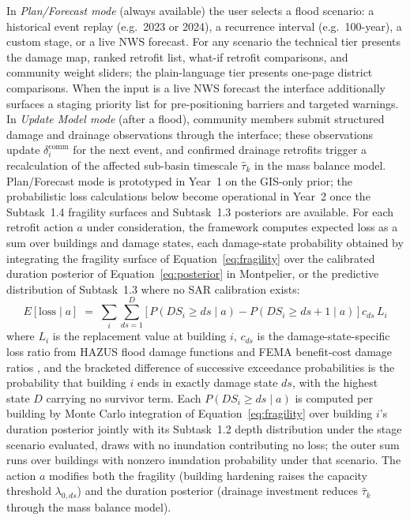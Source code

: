 \documentclass[11pt]{article}
\begin{document}
In \textit{Plan/Forecast mode} (always available) the user selects a flood scenario: a historical event replay (e.g.\ 2023 or 2024), a recurrence interval (e.g.\ 100-year), a custom stage, or a live NWS forecast. For any scenario the technical tier presents the damage map, ranked retrofit list, what-if retrofit comparisons, and community weight sliders; the plain-language tier presents one-page district comparisons. When the input is a live NWS forecast the interface additionally surfaces a staging priority list for pre-positioning barriers and targeted warnings.
In \textit{Update Model mode} (after a flood), community members submit structured
damage and drainage observations through the interface; these observations update
$\delta_i^{\mathrm{comm}}$ for the next event, and confirmed drainage retrofits
trigger a recalculation of the affected sub-basin timescale $\hat{\tau}_k$ in the
mass balance model.
Plan/Forecast mode is prototyped in Year~1 on the GIS-only prior; the probabilistic loss calculations below become operational in Year~2 once the Subtask~1.4 fragility surfaces and Subtask~1.3 posteriors are available.
For each retrofit action $a$ under consideration, the framework computes expected
loss as a sum over buildings and damage states, each damage-state probability
obtained by integrating the fragility surface of Equation~\eqref{eq:fragility}
over the calibrated duration posterior of Equation~\eqref{eq:posterior} in
Montpelier, or the predictive distribution of Subtask~1.3 where no SAR
calibration exists:
\begin{equation}\label{eq:loss}
  E[\text{loss} \mid a] \;=\;
  \sum_{i} \sum_{ds=1}^{D}
    \bigl[\,P(DS_i \geq ds \mid a) - P(DS_i \geq ds{+}1 \mid a)\,\bigr]\,
    c_{ds}\, L_i
\end{equation}
where $L_i$ is the replacement value at building $i$, $c_{ds}$ is the
damage-state-specific loss ratio from HAZUS flood damage functions and FEMA
benefit-cost damage ratios \cite{fema2025hazus,fema2019bcatoolkit}, and the
bracketed difference of successive exceedance probabilities is the probability
that building $i$ ends in exactly damage state $ds$, with the highest state $D$
carrying no survivor term. Each $P(DS_i \geq ds \mid a)$ is computed per building by Monte Carlo integration of Equation~\eqref{eq:fragility} over building $i$'s duration posterior jointly with its Subtask~1.2 depth distribution under the stage scenario evaluated, draws with no inundation contributing no loss; the outer sum runs over buildings with nonzero inundation probability under that scenario. The action $a$ modifies both the fragility (building hardening raises the capacity threshold $\lambda_{0,ds}$) and the duration posterior (drainage investment reduces $\hat{\tau}_k$ through the mass balance model).
\end{document}
